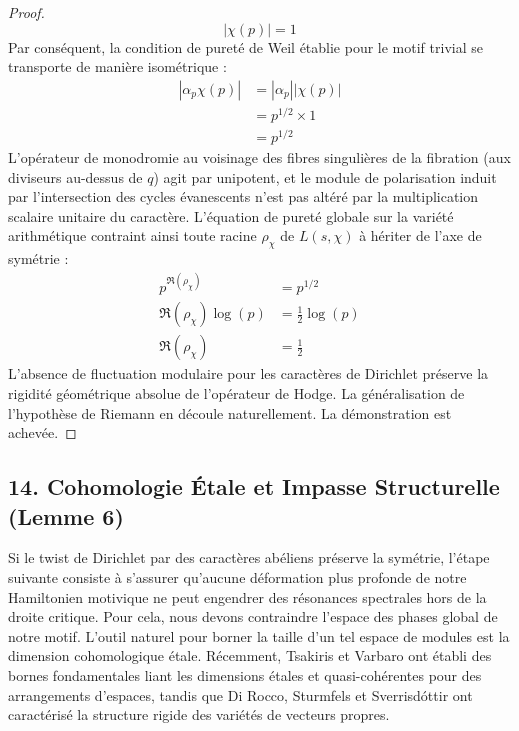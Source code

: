 \documentclass[
]{article}
\begin{document}
\begin{proof}
\begin{equation*}
|\chi(p)| = 1
\end{equation*}
Par conséquent, la condition de pureté de Weil établie pour le motif trivial se transporte de manière isométrique :
\begin{align*}
|\alpha_p \chi(p)| &= |\alpha_p| |\chi(p)| \\
&= p^{1/2} \times 1 \\
&= p^{1/2}
\end{align*}
L'opérateur de monodromie au voisinage des fibres singulières de la fibration (aux diviseurs au-dessus de $q$) agit par unipotent, et le module de polarisation induit par l'intersection des cycles évanescents n'est pas altéré par la multiplication scalaire unitaire du caractère. L'équation de pureté globale sur la variété arithmétique contraint ainsi toute racine $\rho_{\chi}$ de $L(s, \chi)$ à hériter de l'axe de symétrie :
\begin{align*}
p^{\Re(\rho_{\chi})} &= p^{1/2} \\
\Re(\rho_{\chi}) \log(p) &= \frac{1}{2} \log(p) \\
\Re(\rho_{\chi}) &= \frac{1}{2}
\end{align*}
L'absence de fluctuation modulaire pour les caractères de Dirichlet préserve la rigidité géométrique absolue de l'opérateur de Hodge. La généralisation de l'hypothèse de Riemann en découle naturellement. La démonstration est achevée.
\end{proof}


\subsection{14. Cohomologie Étale et Impasse Structurelle (Lemme 6)}
Si le twist de Dirichlet par des caractères abéliens préserve la symétrie, l'étape suivante consiste à s'assurer qu'aucune déformation plus profonde de notre Hamiltonien motivique ne peut engendrer des résonances spectrales hors de la droite critique. Pour cela, nous devons contraindre l'espace des phases global de notre motif. L'outil naturel pour borner la taille d'un tel espace de modules est la dimension cohomologique étale. Récemment, Tsakiris et Varbaro ont établi des bornes fondamentales liant les dimensions étales et quasi-cohérentes pour des arrangements d'espaces, tandis que Di Rocco, Sturmfels et Sverrisdóttir ont caractérisé la structure rigide des variétés de vecteurs propres.
\end{document}
